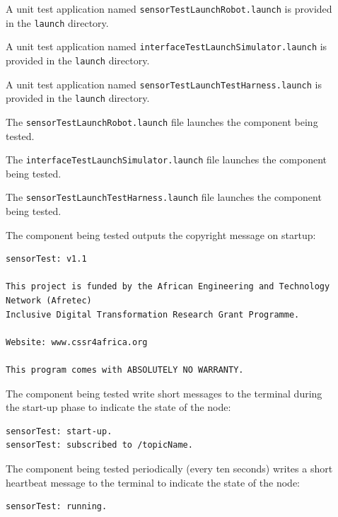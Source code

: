 \documentclass{CSSRforAfrica}
\newcommand{\checkboxChecked}{\fbox{\ding{51}}} %
\newcommand{\checkboxDashed}{\fbox{--}}         %
\begin{document}
\begin{description}

\item[\checkboxChecked] A unit test application named {\small \verb+sensorTestLaunchRobot.launch+} is provided in the {\small \verb+launch+} directory. 

\item[\checkboxChecked] A unit test application named {\small \verb+interfaceTestLaunchSimulator.launch+} is provided in the {\small \verb+launch+} directory.

\item[\checkboxDashed] A unit test application named {\small \verb+sensorTestLaunchTestHarness.launch+} is provided in the {\small \verb+launch+} directory.

\item[\checkboxChecked] The {\small \verb+sensorTestLaunchRobot.launch+} file  launches the component being tested.

\item[\checkboxChecked] The {\small \verb+interfaceTestLaunchSimulator.launch+} file  launches the component being tested.

\item[\checkboxDashed] The {\small \verb+sensorTestLaunchTestHarness.launch+} file  launches the component being tested.

\item[\checkboxChecked] The component being tested outputs the copyright message on startup:  \\ 
{\scriptsize
\begin{verbatim}
sensorTest: v1.1

This project is funded by the African Engineering and Technology Network (Afretec) 
Inclusive Digital Transformation Research Grant Programme. 

Website: www.cssr4africa.org

This program comes with ABSOLUTELY NO WARRANTY.
\end{verbatim}
}

\item[\checkboxChecked] The component being tested write short messages to the terminal  during the start-up phase to indicate the state of the node:
{\small
\begin{verbatim}
sensorTest: start-up.
sensorTest: subscribed to /topicName.
\end{verbatim}
} 

\item[\checkboxChecked] The component being tested periodically (every ten seconds) writes a short heartbeat message to the terminal to indicate the state of the node:
{\small
\begin{verbatim}
sensorTest: running.
\end{verbatim}
}


\end{description}
\end{document}
